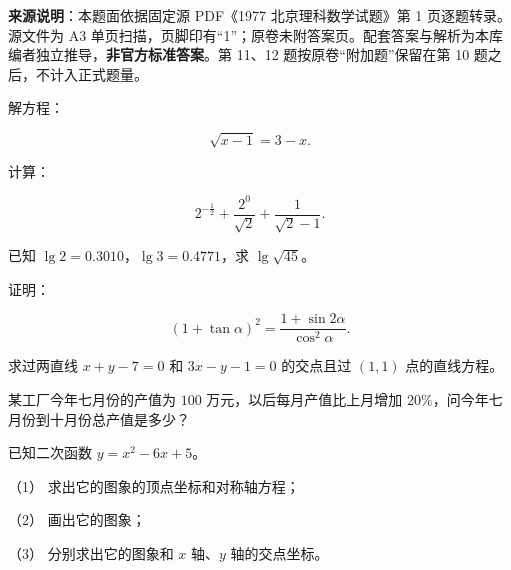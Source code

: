 

\begin{gktip}
\textbf{来源说明}：本题面依据固定源 PDF《1977 北京理科数学试题》第 1 页逐题转录。源文件为 A3 单页扫描，页脚印有“1”；原卷未附答案页。配套答案与解析为本库编者独立推导，\textbf{非官方标准答案}。第 11、12 题按原卷“附加题”保留在第 10 题之后，不计入正式题量。
\end{gktip}

\par\medskip

\begin{question}
解方程：

\nopagebreak[4]
\[
\sqrt{x-1}=3-x.
\]

\end{question}
\begin{question}
计算：

\nopagebreak[4]
\[
2^{-\frac12}+\frac{2^0}{\sqrt2}+\frac1{\sqrt2-1}.
\]

\end{question}
\begin{question}
已知 $\lg2=0.3010$，$\lg3=0.4771$，求 $\lg\sqrt{45}$。

\end{question}
\begin{question}
证明：

\nopagebreak[4]
\[
(1+\tan\alpha)^2=\frac{1+\sin2\alpha}{\cos^2\alpha}.
\]

\end{question}
\begin{question}
求过两直线 $x+y-7=0$ 和 $3x-y-1=0$ 的交点且过 $(1,1)$ 点的直线方程。

\end{question}
\begin{question}
某工厂今年七月份的产值为 $100$ 万元，以后每月产值比上月增加 $20\%$，问今年七月份到十月份总产值是多少？

\end{question}
\begin{question}
已知二次函数 $y=x^2-6x+5$。

（1） 求出它的图象的顶点坐标和对称轴方程；

（2） 画出它的图象；

（3） 分别求出它的图象和 $x$ 轴、$y$ 轴的交点坐标。

\end{question}
